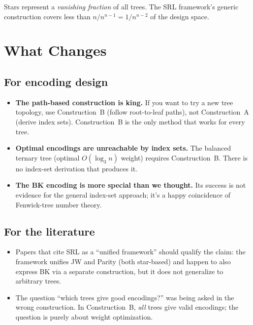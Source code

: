 \documentclass[11pt,a4paper]{article}
\theoremstyle{definition}
\begin{document}
Stars represent a \emph{vanishing fraction} of all trees.  The SRL
framework's generic construction covers less than $n/n^{n-1} = 1/n^{n-2}$
of the design space.

\section{What Changes}
\label{sec:consequences}

\subsection{For encoding design}

\begin{itemize}
  \item \textbf{The path-based construction is king.}  If you want to
    try a new tree topology, use Construction~B (follow root-to-leaf
    paths), not Construction~A (derive index sets).  Construction~B is
    the only method that works for every tree.

  \item \textbf{Optimal encodings are unreachable by index sets.}  The
    balanced ternary tree (optimal $O(\log_3 n)$ weight) requires
    Construction~B.  There is no index-set derivation that produces it.

  \item \textbf{The BK encoding is more special than we thought.}  Its
    success is not evidence for the general index-set approach; it's a
    happy coincidence of Fenwick-tree number theory.
\end{itemize}

\subsection{For the literature}

\begin{itemize}
  \item Papers that cite SRL as a ``unified framework'' should qualify
    the claim: the framework unifies JW and Parity (both star-based)
    and happen to also express BK via a separate construction, but it
    does not generalize to arbitrary trees.

  \item The question ``which trees give good encodings?'' was being
    asked in the wrong construction.  In Construction~B, \emph{all}
    trees give valid encodings; the question is purely about weight
    optimization.
\end{itemize}
\end{document}
